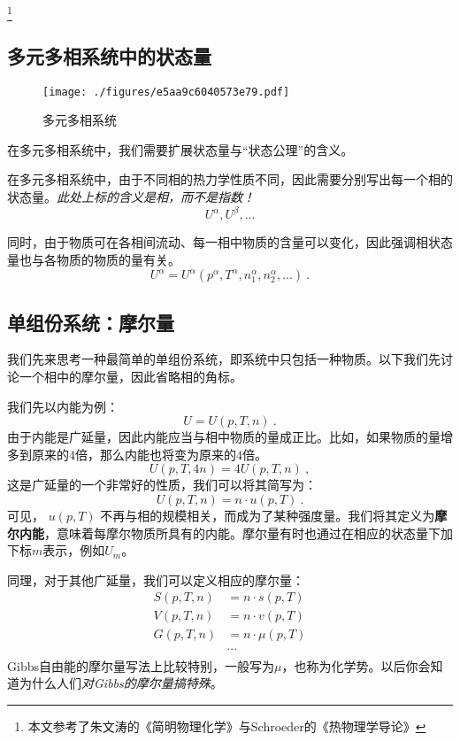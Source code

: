 
\footnote{本文参考了朱文涛的《简明物理化学》与Schroeder的《热物理学导论》}

\subsection{多元多相系统中的状态量}
\begin{figure}[ht]
\centering
\texttt{[image: ./figures/e5aa9c6040573e79.pdf]}
\caption{多元多相系统} \label{fig_ParMol_1}
\end{figure}

在多元多相系统中，我们需要扩展状态量与“状态公理”的含义。

在多元多相系统中，由于不同相的热力学性质不同，因此需要分别写出每一个相的状态量。\textsl{此处上标的含义是相，而不是指数！}
$$U^\alpha, U^\beta,...$$

同时，由于物质可在各相间流动、每一相中物质的含量可以变化，因此强调相状态量也与各物质的物质的量有关。
$$U^\alpha = U^\alpha (p^\alpha, T^\alpha, n_1^\alpha,n_2^\alpha,...)~.$$

\subsection{单组份系统：摩尔量}
我们先来思考一种最简单的单组份系统，即系统中只包括一种物质。以下我们先讨论一个相中的摩尔量，因此省略相的角标。

我们先以内能为例：
$$U = U (p, T, n)~.$$
由于内能是广延量，因此内能应当与相中物质的量成正比。比如，如果物质的量增多到原来的$4$倍，那么内能也将变为原来的$4$倍。
$$U(p, T, 4 n) = 4 U (p, T, n)~,$$
这是广延量的一个非常好的性质，我们可以将其简写为：
$$U(p, T, n) = n \cdot u (p, T)~.$$
可见， $u (p, T)$ 不再与相的规模相关，而成为了某种强度量。我们将其定义为\textbf{摩尔内能}，意味着每摩尔物质所具有的内能。摩尔量有时也通过在相应的状态量下加下标$m$表示，例如$U_m$。

同理，对于其他广延量，我们可以定义相应的摩尔量：
$$
\begin{aligned}
S(p, T, n) &= n \cdot s (p, T)\\
V(p, T, n) &= n \cdot v (p, T)\\
G(p, T, n) &= n \cdot \mu (p, T)\\
&...\\
\end{aligned}
$$
Gibbs自由能的摩尔量写法上比较特别，一般写为$\mu$，也称为化学势。以后你会知道为什么人们\textsl{对Gibbs的摩尔量搞特殊}。

